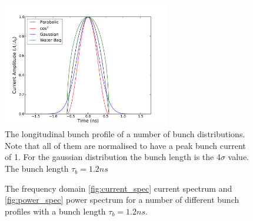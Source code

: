 \documentclass[12pt,a4paper,twopage,openright]{report}
\begin{document}
\begin{figure}
\begin{center}
\includegraphics[width=0.65\textwidth]{figures/bunch_profile_12ns.pdf}
\end{center}
\label{fig:time_bunch_profiles}
\caption{The longitudinal bunch profile of a number of bunch distributions. Note that all of them are normalised to have a peak bunch current of 1. For the gaussian distribution the bunch length is the 4$\sigma$ value. The bunch length $\tau_{b} = 1.2ns$}
\end{figure}

\begin{figure}
\label{fig:freq_dom_prof}
\caption{The frequency domain \ref{fig:current_spec} current spectrum and \ref{fig:power_spec} power spectrum for a number of different bunch profiles with a bunch length $\tau_{b} = 1.2ns$.}
\end{figure}
\end{document}
